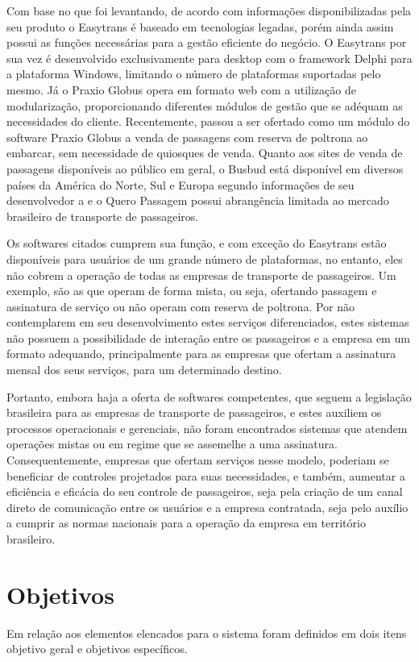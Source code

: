 \documentclass[12pt]{article}
\begin{document}
Com base no que foi levantando, de acordo com informações disponibilizadas pela \cite{easy} seu produto o Easytrans é baseado em tecnologias legadas, porém ainda assim possui as funções necessárias para a gestão eficiente do negócio. O Easytrans por sua vez é desenvolvido exclusivamente para desktop com o framework Delphi para a plataforma Windows, limitando o número de plataformas suportadas pelo mesmo. Já o Praxio Globus opera em formato web com a utilização de modularização, proporcionando diferentes módulos de gestão que se adéquam as necessidades do cliente. Recentemente, passou a ser ofertado como um módulo do software Praxio Globus a venda de passagens com reserva de poltrona ao embarcar, sem necessidade de quiosques de venda. Quanto aos sites de venda de passagens disponíveis ao público em geral, o Busbud está disponível em diversos países da América do Norte, Sul e Europa segundo informações de seu desenvolvedor a \cite{busbud} e o Quero Passagem possui abrangência limitada ao mercado brasileiro de transporte de passageiros.

Os softwares citados cumprem sua função, e com exceção do Easytrans estão disponíveis para usuários de um grande número de plataformas, no entanto, eles não cobrem a operação de todas as empresas de transporte de passageiros. Um exemplo, são as que operam de forma mista, ou seja, ofertando passagem e assinatura de serviço ou não operam com reserva de poltrona. Por não contemplarem em seu desenvolvimento estes serviços diferenciados, estes sistemas não possuem a possibilidade de interação entre os passageiros e a empresa em um formato adequando, principalmente para as empresas que ofertam a assinatura mensal dos seus serviços, para um determinado destino. 

Portanto, embora haja a oferta de softwares competentes, que seguem a legislação brasileira para as empresas de transporte de passageiros, e estes auxiliem os processos operacionais e gerenciais, não foram encontrados sistemas que atendem operações mistas ou em regime que se assemelhe a uma assinatura. Consequentemente, empresas que ofertam serviços nesse modelo, poderiam se beneficiar de controles projetados para suas necessidades, e também, aumentar a eficiência e eficácia do seu controle de passageiros, seja pela criação de um canal direto de comunicação entre os usuários e a empresa contratada, seja pelo auxílio a cumprir as normas nacionais para a operação da empresa em território brasileiro.

\section{Objetivos}
Em relação aos elementos elencados para o sistema foram definidos em dois itens objetivo geral e objetivos específicos.
\end{document}
